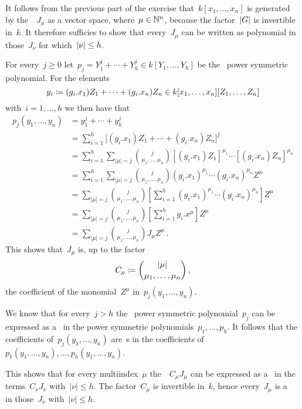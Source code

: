 It follows from the previous part of the exercise that~$k[x_1, \dotsc, x_n]$ is generated by the~~$J_\mu$ as a vector space, where~$\mu \in \mathbb{N}^n$, because the factor~$\lvert G\rvert$ is invertible in~$k$.
It therefore sufficies to show that every~$J_\mu$ can be written as polynomial in those~$J_\nu$ for which~$\lvert\nu\rvert \leq h$.
  
For every~$j \geq 0$ let~$p_j = Y_1^j + \dotsb + Y_h^j \in k[Y_1, \dotsc, Y_h]$ be the~ power symmetric polynomial.
For the elements
\[
            y_i
  \coloneqq  (g_i.x_1) Z_1 + \dotsb + (g_i.x_n) Z_n
  \in       k[x_1, \dotsc, x_n][Z_1, \dotsc, Z_n]
\]
with~$i = 1, \dotsc, h$ we then have that
\begingroup
\allowdisplaybreaks
\begin{align*}
      p_j(y_1, \dotsc, y_n)
  &=  y_1^j + \dotsb + y_h^j  \\
  &=  \sum_{i=1}^h \bigl[ (g_i.x_1) Z_1 + \dotsb + (g_i.x_n) Z_n \bigr]^j  \\
  &=  \sum_{i=1}^h \sum_{|\mu| = j}
      \binom{j}{\mu_1, \dotsc, \mu_n} [(g_i.x_1) Z_1]^{\mu_1} \dotsm [(g_i.x_n) Z_n]^{\mu_n}  \\
  &=  \sum_{i=1}^h \sum_{|\mu| = j}
      \binom{j}{\mu_1, \dotsc, \mu_n} (g_i.x_1)^{\mu_1} \dotsm (g_i.x_n)^{\mu_n} Z^\mu \\
  &=  \sum_{|\mu| = j} \binom{j}{\mu_1, \dotsc, \mu_n}
      \left[
        \sum_{i=1}^h (g_i.x_1)^{\mu_1} \dotsm (g_i.x_n)^{\mu_n}
      \right]
      Z^\mu  \\
  &=  \sum_{|\mu| = j} \binom{j}{\mu_1, \dotsc, \mu_n}
      \left[
        \sum_{i=1}^h g_i.x^\mu
      \right]
      Z^\mu  \\
  &=  \sum_{|\mu| = j} \binom{j}{\mu_1, \dotsc, \mu_n} J_\mu Z^\mu \,.
\end{align*}
\endgroup
This shows that~$J_\mu$ is, up to the factor
\[
            C_\mu
  \coloneqq  \binom{|\mu|}{\mu_1, \dotsc, \mu_n} \,,
\]
the coefficient of the monomial~$Z^\mu$ in~$p_j(y_1, \dotsc, y_n)$.

We know that for every~$j > h$ the~ power symmetric polynomial~$p_j$ can be expressed as a~ in the power symmetric polynomials~$p_1, \dotsc, p_h$.
It follows that the coefficients of~$p_j(y_1, \dotsc, y_n)$ are~s in the coefficients of~$p_1(y_1, \dotsc, y_n), \dotsc, p_h(y_1, \dotsc, y_n)$.

This shows that for every multiindex~$\mu$ the~~$C_\mu J_\mu$ can be expressed as a~ in the terms~$C_\nu J_\nu$ with~$|\nu| \leq h$.
The factor~$C_\mu$ is invertible in~$k$, hence every~$J_\mu$ is a~ in those~$J_\nu$ with~$|\nu| \leq h$.


